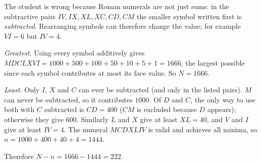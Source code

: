 The student is wrong because Roman numerals are not just sums: in the subtractive pairs $IV,IX,XL,XC,CD,CM$ the smaller symbol written first is \emph{subtracted}. Rearranging symbols can therefore change the value; for example $VI=6$ but $IV=4$.

\emph{Greatest.} Using every symbol additively gives $MDCLXVI=1000+500+100+50+10+5+1=1666$, the largest possible since each symbol contributes at most its face value. So $N=1666$.

\emph{Least.} Only $I$, $X$ and $C$ can ever be subtracted (and only in the listed pairs). $M$ can never be subtracted, so it contributes $1000$. Of $D$ and $C$, the only way to use both with $C$ subtracted is $CD=400$ ($CM$ is excluded because $D$ appears); otherwise they give $600$. Similarly $L$ and $X$ give at least $XL=40$, and $V$ and $I$ give at least $IV=4$. The numeral $MCDXLIV$ is valid and achieves all minima, so $n=1000+400+40+4=1444$.

Therefore $N-n=1666-1444=\boxed{222}$.
